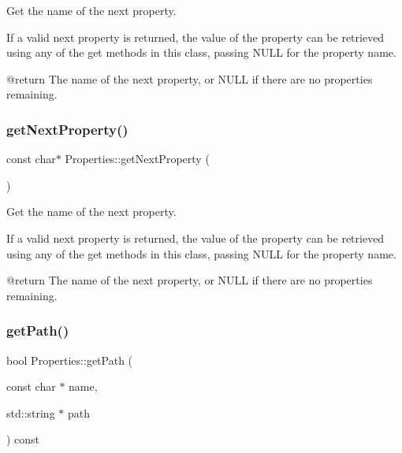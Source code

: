 Get the name of the next property.

If a valid next property is returned, the value of the property can be retrieved using any of the get methods in this class, passing N\+U\+LL for the property name. \begin{DoxyVerb}   @return The name of the next property, or NULL if there are no properties remaining.\end{DoxyVerb}
 \mbox{\label{classProperties_a30173ee790d8dc35635723647883e1a0}} 
\subsubsection{\texorpdfstring{get\+Next\+Property()}{getNextProperty()}\hspace{0.1cm}{\footnotesize\ttfamily [2/2]}}
{\footnotesize\ttfamily const char$\ast$ Properties\+::get\+Next\+Property (\begin{DoxyParamCaption}{ }\end{DoxyParamCaption})}

Get the name of the next property.

If a valid next property is returned, the value of the property can be retrieved using any of the get methods in this class, passing N\+U\+LL for the property name. \begin{DoxyVerb}   @return The name of the next property, or NULL if there are no properties remaining.\end{DoxyVerb}
 \mbox{\label{classProperties_a721bf4ef8c0669161a29068ab79fda90}} 
\subsubsection{\texorpdfstring{get\+Path()}{getPath()}\hspace{0.1cm}{\footnotesize\ttfamily [1/2]}}
{\footnotesize\ttfamily bool Properties\+::get\+Path (\begin{DoxyParamCaption}\item[{const char $\ast$}]{name,  }\item[{std\+::string $\ast$}]{path }\end{DoxyParamCaption}) const}


